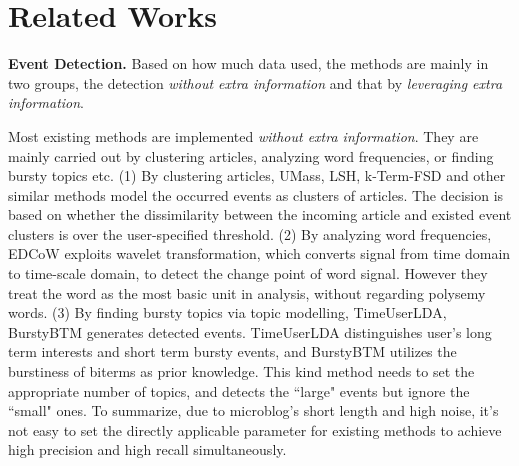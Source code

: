 \documentclass[runningheads,a4paper]{llncs}
\theoremstyle{exampstyle}
\begin{document}
\section{Related Works}
\label{sec:relatedWorks}
\textbf{Event Detection.} Based on how much data used, the methods are mainly in two groups, the detection \textit{without extra information} and that by \textit{leveraging extra information}. 

Most existing methods are implemented \textit{without extra information}.
They are mainly carried out by clustering articles\cite{Allan:2000wu,Petrovic:2010uj,Wurzer:2015wq}, analyzing word frequencies\cite{Mathioudakis:2010fc,Weng:2011wz}, or finding bursty topics\cite{Diao:2012wj,Yan:2015wm} etc. 
(1) By clustering articles, UMass\cite{Allan:2000wu}, LSH\cite{Petrovic:2010uj}, k-Term-FSD\cite{Wurzer:2015wq} and other similar methods model the occurred events as clusters of articles.
The decision is based on whether the dissimilarity between the incoming article and existed event clusters is over the user-specified threshold. 
(2) By analyzing word frequencies, EDCoW\cite{Weng:2011wz} exploits wavelet transformation, which converts signal from time domain to time-scale domain, to detect the change point of word signal. 
However they treat the word as the most basic unit in analysis, without regarding polysemy words.
(3) By finding bursty topics via topic modelling, TimeUserLDA\cite{Diao:2012wj}, BurstyBTM\cite{Yan:2015wm} generates detected events.
TimeUserLDA distinguishes user's long term interests and short term bursty events, and BurstyBTM utilizes the burstiness of biterms as prior knowledge.
This kind method needs to set the appropriate number of topics, and detects the ``large" events but ignore the ``small" ones. 
To summarize, due to microblog's short length and high noise, it's not easy to set the directly applicable parameter for existing methods to achieve high precision and high recall simultaneously.
\end{document}
